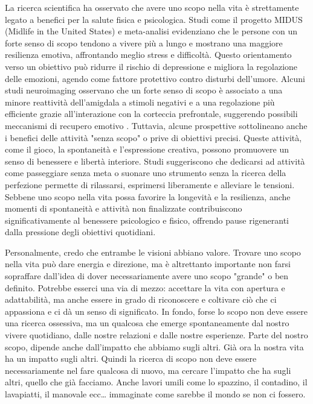 \documentclass[12pt]{book} %
\begin{document}
\begin{mdframed}[linewidth=1pt]
La ricerca scientifica ha osservato che avere uno scopo nella vita è strettamente legato a benefici per la salute fisica e psicologica. Studi come il progetto MIDUS (Midlife in the United States) e meta-analisi evidenziano che le persone con un forte senso di scopo tendono a vivere più a lungo e mostrano una maggiore resilienza emotiva, affrontando meglio stress e difficoltà. Questo orientamento verso un obiettivo può ridurre il rischio di depressione e migliora la regolazione delle emozioni, agendo come fattore protettivo contro disturbi dell’umore. Alcuni studi neuroimaging osservano che un forte senso di scopo è associato a una minore reattività dell’amigdala a stimoli negativi e a una regolazione più efficiente grazie all’interazione con la corteccia prefrontale, suggerendo possibili meccanismi di recupero emotivo  . Tuttavia, alcune prospettive sottolineano anche i benefici delle attività "senza scopo" o prive di obiettivi precisi. Queste attività, come il gioco, la spontaneità e l’espressione creativa, possono promuovere un senso di benessere e libertà interiore. Studi suggeriscono che dedicarsi ad attività come passeggiare senza meta o suonare uno strumento senza la ricerca della perfezione permette di rilassarsi, esprimersi liberamente e alleviare le tensioni. Sebbene uno scopo nella vita possa favorire la longevità e la resilienza, anche momenti di spontaneità e attività non finalizzate contribuiscono significativamente al benessere psicologico e fisico, offrendo pause rigeneranti dalla pressione degli obiettivi quotidiani.

Personalmente, credo che entrambe le visioni abbiano valore. Trovare uno scopo nella vita può dare energia e direzione, ma è altrettanto importante non farsi sopraffare dall'idea di dover necessariamente avere uno scopo "grande" o ben definito. Potrebbe esserci una via di mezzo: accettare la vita con apertura e adattabilità, ma anche essere in grado di riconoscere e coltivare ciò che ci appassiona e ci dà un senso di significato. In fondo, forse lo scopo non deve essere una ricerca ossessiva, ma un qualcosa che emerge spontaneamente dal nostro vivere quotidiano, dalle nostre relazioni e dalle nostre esperienze. Parte del nostro scopo, dipende anche dall'impatto che abbiamo sugli altri. Già ora la nostra vita ha un impatto sugli altri. Quindi la ricerca di scopo non deve essere necessariamente nel fare qualcosa di nuovo, ma cercare l'impatto che ha sugli altri, quello che già facciamo. Anche lavori umili come lo spazzino, il contadino, il lavapiatti, il manovale ecc… immaginate come sarebbe il mondo se non ci fossero.
\end{mdframed}
\end{document}
